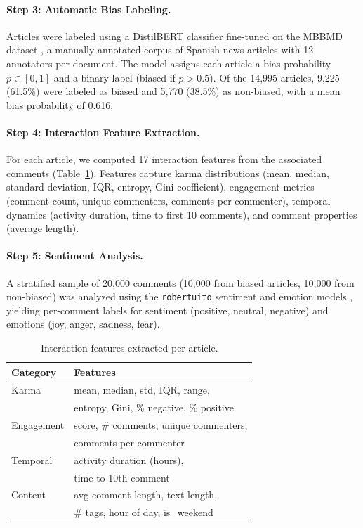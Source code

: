 \paragraph{Step 3: Automatic Bias Labeling.}
Articles were labeled using a DistilBERT classifier fine-tuned on the MBBMD dataset \cite{rodrigo2025mbbmd}, a manually annotated corpus of Spanish news articles with 12 annotators per document.
The model assigns each article a bias probability $p \in [0,1]$ and a binary label (biased if $p > 0.5$).
Of the 14,995 articles, 9,225 (61.5\%) were labeled as biased and 5,770 (38.5\%) as non-biased, with a mean bias probability of 0.616.

\paragraph{Step 4: Interaction Feature Extraction.}
For each article, we computed 17 interaction features from the associated comments (Table~\ref{tab:features}).
Features capture karma distributions (mean, median, standard deviation, IQR, entropy, Gini coefficient), engagement metrics (comment count, unique commenters, comments per commenter), temporal dynamics (activity duration, time to first 10 comments), and comment properties (average length).

\paragraph{Step 5: Sentiment Analysis.}
A stratified sample of 20,000 comments (10,000 from biased articles, 10,000 from non-biased) was analyzed using the \texttt{robertuito} sentiment and emotion models \cite{perez2022robertuito}, yielding per-comment labels for sentiment (positive, neutral, negative) and emotions (joy, anger, sadness, fear).

\begin{table}[t]
\centering
\small
\begin{tabular}{ll}
\toprule
\textbf{Category} & \textbf{Features} \\
\midrule
Karma & mean, median, std, IQR, range, \\
 & entropy, Gini, \% negative, \% positive \\
Engagement & score, \# comments, unique commenters, \\
 & comments per commenter \\
Temporal & activity duration (hours), \\
 & time to 10th comment \\
Content & avg comment length, text length, \\
 & \# tags, hour of day, is\_weekend \\
\bottomrule
\end{tabular}
\caption{Interaction features extracted per article.}
\label{tab:features}
\end{table}

